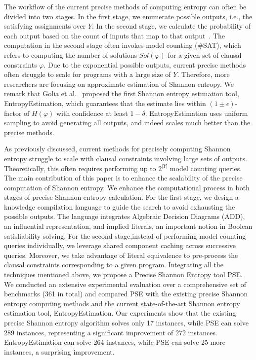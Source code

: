 The workflow of the current precise methods of computing entropy can often be divided into two stages. 
In the first stage, we enumerate possible outputs, i.e., the satisfying assignments over $Y$. 
In the second stage, we calculate the probability of each output based on the count of inputs that map to that output~\cite{golia2022scalable}.
The computation in the second stage often invokes model counting (\#SAT), which refers to computing the number of solutions $\mathit{Sol}(\varphi)$ for a given set of clausal constraints $\varphi$. 
Due to the exponential possible outputs, current precise methods often struggle to scale for programs with a large size of $Y$.
Therefore, more researchers are focusing on approximate estimation of Shannon entropy.
We remark that Golia et al.~\cite{golia2022scalable} proposed the first Shannon entropy estimation tool, EntropyEstimation, which guarantees that the estimate lies within $(1 \pm \epsilon)$-factor of $H(\varphi)$ with confidence at least $1-\delta$.
EntropyEstimation uses uniform sampling to avoid generating all outputs, and indeed scales much better than the precise methods. 

As previously discussed, current methods for precisely computing Shannon entropy struggle to scale with clausal constraints involving large sets of outputs.
Theoretically, this often requires performing up to $2^{|Y|}$ model counting queries. The main contribution of this paper is to enhance the scalability of the precise computation of Shannon entropy. 
We enhance the computational process in both stages of precise Shannon entropy calculation.
For the first stage, we design a knowledge compilation language to guide the search to avoid exhausting the possible outputs. 
The language integrates Algebraic Decision Diagrams (ADD), an influential representation, and implied literals, an important notion in Boolean satisfiability solving.
For the second stage,instead of performing model counting queries individually, we leverage shared component caching across successive queries.
Moreover, we take advantage of literal equivalence to pre-process the clausal constraints corresponding to a given program.
Integrating all the techniques mentioned above, we propose a Precise Shannon Entropy tool PSE.
We conducted an extensive experimental evaluation over a comprehensive set of benchmarks (361 in total) and compared PSE with the existing precise Shannon entropy computing methods and the current state-of-the-art Shannon entropy estimation tool, EntropyEstimation.
Our experiments show that the existing precise Shannon entropy algorithm solves only 17 instances, while PSE can solve 289 instances, representing a significant improvement of 272 instances.
EntropyEstimation can solve 264 instances, while PSE can solve 25 more instances, a surprising improvement.

